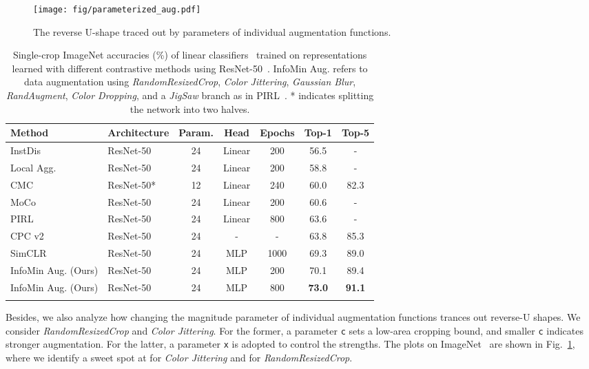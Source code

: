 \documentclass{article}
\begin{document}
\begin{figure}[t]
\centering
\texttt{[image: fig/parameterized\_aug.pdf]}
\caption{The reverse U-shape traced out by parameters of individual augmentation functions.}
\vspace{-10pt}
\label{fig:parametric}
\end{figure}
 \begin{table}[h]
\small
\centering
\vspace{-10pt}
\caption{\small Single-crop ImageNet accuracies (\%) of linear classifiers~\protect\cite{zhang2016colorful} trained on representations learned with different contrastive methods using ResNet-50~\protect\cite{he2016deep}. InfoMin Aug. refers to data augmentation using \protect\emph{RandomResizedCrop}, \protect\emph{Color Jittering}, \protect\emph{Gaussian Blur}, \protect\emph{RandAugment}, \protect\emph{Color Dropping}, and a \emph{JigSaw} branch as in PIRL~\protect\cite{misra2019self}. * indicates splitting the network into two halves.}
\label{tab:imagenet}
\vspace{5pt}
\begin{tabular}{llccccc}
\toprule
Method & Architecture        & Param. & Head & Epochs & Top-1 & Top-5 \\ \midrule
InstDis~\cite{wu2018unsupervised}   & ResNet-50    & 24  & Linear & 200  & 56.5  & -    \\
Local Agg.~\cite{zhuang2019local}   & ResNet-50    & 24  & Linear & 200  & 58.8  & -     \\
CMC~\cite{tian2019contrastive}      & ResNet-50*   & 12  & Linear & 240  & 60.0  & 82.3     \\
MoCo~\cite{he2019momentum}          & ResNet-50    & 24  & Linear & 200  & 60.6  & -     \\
PIRL~\cite{misra2019self}           & ResNet-50    & 24  & Linear & 800  & 63.6  & -  \\
CPC v2~\cite{henaff2019data}        & ResNet-50    & 24  & - &  -   & 63.8  & 85.3  \\
SimCLR~\cite{chen2020simple}        & ResNet-50    & 24   & MLP & 1000 & 69.3    & 89.0    \\
\midrule
InfoMin Aug. (Ours)& ResNet-50   & 24  & MLP    & 200 & 70.1 & 89.4 \\
InfoMin Aug. (Ours)& ResNet-50   & 24  & MLP    & 800 & \textbf{73.0} & \textbf{91.1}\\
\bottomrule
\vspace{-10pt}
\end{tabular}
\end{table} 
Besides, we also analyze how changing the magnitude parameter of individual augmentation functions trances out reverse-U shapes. We consider \emph{RandomResizedCrop} and \emph{Color Jittering}. For the former, a parameter \texttt{c} sets a low-area cropping bound, and smaller \texttt{c} indicates stronger augmentation. For the latter, a parameter \texttt{x} is adopted to control the strengths. The plots on ImageNet~\cite{deng2009imagenet} are shown in Fig.~\ref{fig:parametric}, where we identify a sweet spot at  for \emph{Color Jittering} and  for \emph{RandomResizedCrop}.
\end{document}
